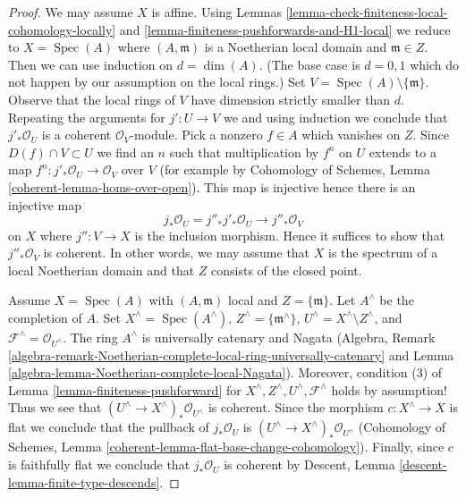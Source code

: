 \documentclass[10pt,a4paper]{amsart}
\theoremstyle{plain}
\theoremstyle{definition}
\theoremstyle{remark}
\numberwithin{equation}{subsection}
\def\Spec{\mathop{\mathrm{Spec}}}
\begin{document}
\begin{proof}
We may assume $X$ is affine.
Using Lemmas \ref{lemma-check-finiteness-local-cohomology-locally} and
\ref{lemma-finiteness-pushforwards-and-H1-local} we reduce to
$X = \Spec(A)$ where $(A, \mathfrak m)$ is a Noetherian local domain
and $\mathfrak m \in Z$.
Then we can use induction on $d = \dim(A)$.
(The base case is $d = 0, 1$ which do not happen by
our assumption on the local rings.)
Set $V = \Spec(A) \setminus \{\mathfrak m\}$.
Observe that the local rings of $V$ have dimension strictly smaller than $d$.
Repeating the arguments for $j' : U \to V$ we
and using induction we conclude that $j'_*\mathcal{O}_U$ is
a coherent $\mathcal{O}_V$-module.
Pick a nonzero $f \in A$ which vanishes on $Z$.
Since $D(f) \cap V \subset U$ we find an $n$ such that
multiplication by $f^n$ on $U$ extends to a map
$f^n : j'_*\mathcal{O}_U \to \mathcal{O}_V$ over $V$
(for example by Cohomology of Schemes, Lemma
\ref{coherent-lemma-homs-over-open}). This map is injective
hence there is an injective map
$$
j_*\mathcal{O}_U = j''_* j'_* \mathcal{O}_U \to j''_*\mathcal{O}_V
$$
on $X$ where $j'' : V \to X$ is the inclusion morphism.
Hence it suffices to show that $j''_*\mathcal{O}_V$ is coherent.
In other words, we may assume that $X$ is the spectrum
of a local Noetherian domain and that $Z$
consists of the closed point.

\medskip\noindent
Assume $X = \Spec(A)$ with $(A, \mathfrak m)$ local and $Z = \{\mathfrak m\}$.
Let $A^\wedge$ be the completion of $A$.
Set $X^\wedge = \Spec(A^\wedge)$, $Z^\wedge = \{\mathfrak m^\wedge\}$,
$U^\wedge = X^\wedge \setminus Z^\wedge$, and
$\mathcal{F}^\wedge = \mathcal{O}_{U^\wedge}$.
The ring $A^\wedge$ is universally catenary and Nagata (Algebra, Remark
\ref{algebra-remark-Noetherian-complete-local-ring-universally-catenary} and
Lemma \ref{algebra-lemma-Noetherian-complete-local-Nagata}).
Moreover, condition (3) of Lemma \ref{lemma-finiteness-pushforward}
for $X^\wedge, Z^\wedge, U^\wedge, \mathcal{F}^\wedge$
holds by assumption! Thus we see that
$(U^\wedge \to X^\wedge)_*\mathcal{O}_{U^\wedge}$
is coherent. Since the morphism $c : X^\wedge \to X$
is flat we conclude that the pullback of $j_*\mathcal{O}_U$ is
$(U^\wedge \to X^\wedge)_*\mathcal{O}_{U^\wedge}$
(Cohomology of Schemes, Lemma
\ref{coherent-lemma-flat-base-change-cohomology}).
Finally, since $c$ is faithfully flat we conclude that
$j_*\mathcal{O}_U$ is coherent by
Descent, Lemma \ref{descent-lemma-finite-type-descends}.
\end{proof}
\end{document}

